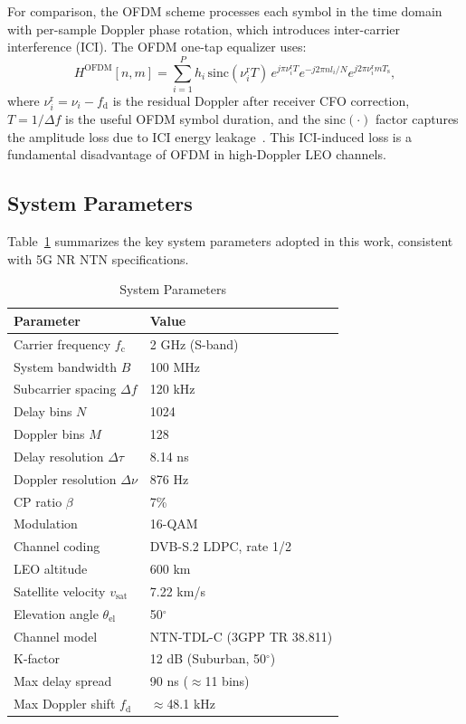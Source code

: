 For comparison, the OFDM scheme processes each symbol in the time domain with per-sample Doppler phase rotation, which introduces inter-carrier interference (ICI). The OFDM one-tap equalizer uses:
\begin{equation}\label{eq:tf_ofdm}
  H^{\mathrm{OFDM}}[n,m] \!=\! \sum_{i=1}^{P} h_i \,\mathrm{sinc}(\nu_i^{\mathrm{r}} T) \, e^{j\pi \nu_i^{\mathrm{r}} T} e^{-j2\pi n l_i / N} e^{j2\pi \nu_i^{\mathrm{r}} m T_{\mathrm{s}}},
\end{equation}
where $\nu_i^{\mathrm{r}} = \nu_i - f_{\mathrm{d}}$ is the residual Doppler after receiver CFO correction, $T = 1/\Delta f$ is the useful OFDM symbol duration, and the $\mathrm{sinc}(\cdot)$ factor captures the amplitude loss due to ICI energy leakage~\cite{wang_ofdm_ici}. This ICI-induced loss is a fundamental disadvantage of OFDM in high-Doppler LEO channels.

\subsection{System Parameters}

Table~\ref{tab:params} summarizes the key system parameters adopted in this work, consistent with 5G NR NTN specifications.

\begin{table}[t]
\centering
\caption{System Parameters}
\label{tab:params}
\renewcommand{\arraystretch}{1.15}
\begin{tabular}{l|l}
\hline
\textbf{Parameter} & \textbf{Value} \\
\hline
Carrier frequency $f_{\mathrm{c}}$ & 2 GHz (S-band) \\
System bandwidth $B$ & 100 MHz \\
Subcarrier spacing $\Delta f$ & 120 kHz \\
Delay bins $N$ & 1024 \\
Doppler bins $M$ & 128 \\
Delay resolution $\Delta\tau$ & 8.14 ns \\
Doppler resolution $\Delta\nu$ & 876 Hz \\
CP ratio $\beta$ & 7\% \\
Modulation & 16-QAM \\
Channel coding & DVB-S.2 LDPC, rate 1/2 \\
LEO altitude & 600 km \\
Satellite velocity $v_{\mathrm{sat}}$ & 7.22 km/s \\
Elevation angle $\theta_{\mathrm{el}}$ & 50$^\circ$ \\
Channel model & NTN-TDL-C (3GPP TR 38.811) \\
K-factor & 12 dB (Suburban, 50$^\circ$) \\
Max delay spread & 90 ns ($\approx$11 bins) \\
Max Doppler shift $f_{\mathrm{d}}$ & $\approx$48.1 kHz \\
\hline
\end{tabular}
\end{table}

